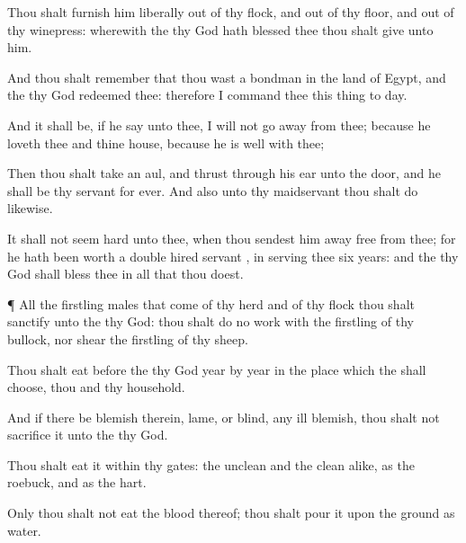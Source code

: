 {Thou shalt
furnish him
liberally out of thy
flock, and out of thy
floor, and out of thy
winepress:
{} wherewith the
{} thy
God hath
blessed thee thou shalt
give unto him.

And thou shalt
remember that thou wast a
bondman in the
land of
Egypt, and the
{} thy
God
redeemed thee: therefore I
command thee this
thing to
day.

And it shall be, if he
say unto thee, I will not go
away from thee; because he
loveth thee and thine
house, because he is
well with thee;

Then thou shalt
take an
aul, and
thrust
{} through his
ear unto the
door, and he shall be thy
servant for
ever. And also unto thy
maidservant thou shalt
do likewise.

It shall not seem
hard unto
thee, when thou sendest him
away
free from thee; for he hath been
worth a
double hired
servant
{}, in
serving thee
six
years: and the
{} thy
God shall
bless thee in all that thou
doest.


\par }{\PP {}¶ All the
firstling
males that
come of thy
herd and of thy
flock thou shalt
sanctify unto the
{} thy
God: thou shalt do no
work with the
firstling of thy
bullock, nor
shear the
firstling of thy
sheep.

Thou shalt
eat
{}
before the
{} thy
God
year by
year in the
place which the
{} shall
choose, thou and thy
household.

And if there be
{}
blemish therein,
{}
lame, or
blind,
{} any
ill
blemish, thou shalt not
sacrifice it unto the
{} thy
God.

Thou shalt
eat it within thy
gates: the
unclean and the
clean
{}
alike, as the
roebuck, and as the
hart.

Only thou shalt not
eat the
blood thereof; thou shalt
pour it upon the
ground as
water.




\par }
